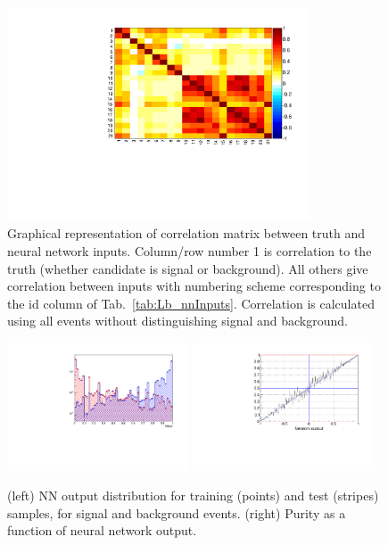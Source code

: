 %
\begin{figure}
\centering
\includegraphics[width=0.8\textwidth]{Lmumu/figs/correlation.pdf}
\caption{Graphical representation of correlation matrix between truth and neural network inputs.
Column/row number 1 is correlation to the truth (whether candidate is signal or background). All
others give correlation between inputs with numbering scheme corresponding to the id column 
of Tab.~\ref{tab:Lb_nnInputs}. Correlation is calculated using all events without distinguishing signal and
background.}
\label{fig:Lb_nnCorrelation}
\end{figure}
%
\begin{figure}
\centering
\includegraphics[width=0.48\textwidth]{Lmumu/figs/TrainAndTest.pdf}
\includegraphics[width=0.48\textwidth]{Lmumu/figs/purity_NN.pdf}
\caption{(left) NN output distribution for training (points) and test (stripes) samples,
for signal and background events. (right) Purity as a function of neural network output.}
\label{fig:Lb_nnDist}
\end{figure}



